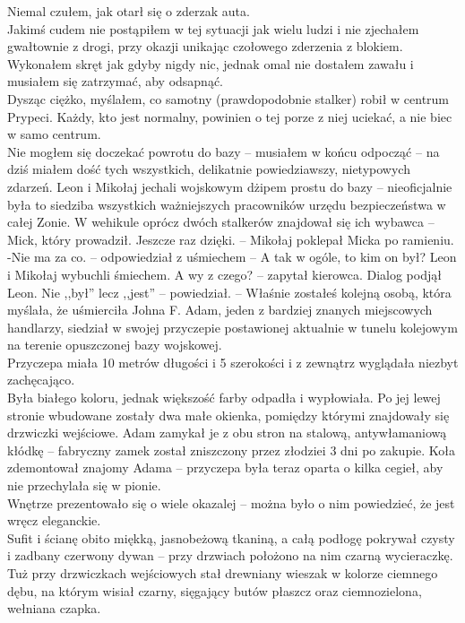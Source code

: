 \documentclass[../MAIN.tex]{subfiles}
\begin{document}
Niemal czułem, jak otarł się o zderzak auta. \\
Jakimś cudem nie postąpiłem w tej sytuacji jak wielu ludzi i nie zjechałem gwałtownie z drogi, przy okazji unikając czołowego zderzenia z blokiem. Wykonałem skręt jak gdyby nigdy nic, jednak omal nie dostałem zawału i musiałem się zatrzymać, aby odsapnąć. \\
Dysząc ciężko, myślałem, co samotny (prawdopodobnie stalker) robił w centrum Prypeci. Każdy, kto jest normalny, powinien o tej porze z niej uciekać, a nie biec w samo centrum. \\
Nie mogłem się doczekać powrotu do bazy -- musiałem w końcu odpocząć -- na dziś miałem dość tych wszystkich, delikatnie powiedziawszy, nietypowych zdarzeń.
%
%
Leon i Mikołaj jechali wojskowym dżipem prostu do bazy -- nieoficjalnie była to siedziba wszystkich ważniejszych pracowników urzędu bezpieczeństwa w całej Zonie. W wehikule oprócz dwóch stalkerów znajdował się ich wybawca -- Mick, który prowadził.
%
\sx Jeszcze raz dzięki. -- Mikołaj poklepał Micka po ramieniu.
-Nie ma za co. -- odpowiedział z uśmiechem -- A tak w ogóle, to kim on był?
\qd
Leon i Mikołaj wybuchli śmiechem.
\sx A wy z czego? -- zapytał kierowca. \qd
Dialog podjął Leon.
\sx Nie ,,był'' lecz ,,jest'' -- powiedział. -- Właśnie zostałeś kolejną osobą, która myślała, że uśmierciła Johna F.
\qd
Adam, jeden z bardziej znanych miejscowych handlarzy, siedział w swojej przyczepie postawionej aktualnie w tunelu kolejowym na terenie opuszczonej bazy wojskowej. \\
Przyczepa miała 10 metrów długości i 5 szerokości i z zewnątrz wyglądała niezbyt zachęcająco. \\
Była białego koloru, jednak większość farby odpadła i wypłowiała. Po jej lewej stronie wbudowane zostały dwa małe okienka, pomiędzy którymi znajdowały się drzwiczki wejściowe. Adam zamykał je z obu stron na stalową, antywłamaniową kłódkę -- fabryczny zamek został zniszczony przez złodziei 3 dni po zakupie. Koła zdemontował znajomy Adama -- przyczepa była teraz oparta o kilka cegieł, aby nie przechylała się w pionie. \\
Wnętrze prezentowało się o wiele okazalej -- można było o nim powiedzieć, że jest wręcz eleganckie. \\
Sufit i ścianę obito miękką, jasnobeżową tkaniną, a całą podłogę pokrywał czysty i zadbany czerwony dywan -- przy drzwiach położono na nim czarną wycieraczkę. \\
Tuż przy drzwiczkach wejściowych stał drewniany wieszak w kolorze ciemnego dębu, na którym wisiał czarny, sięgający butów płaszcz oraz ciemnozielona, wełniana czapka.\\
\end{document}

